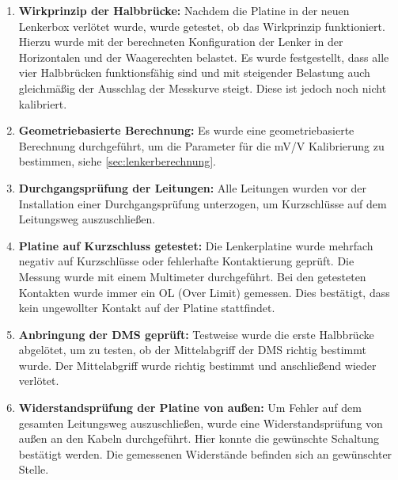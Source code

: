 \begin{enumerate}
    \item \textbf{Wirkprinzip der Halbbrücke:} Nachdem die Platine in der neuen Lenkerbox verlötet wurde, wurde getestet, ob das Wirkprinzip funktioniert. Hierzu wurde mit der berechneten Konfiguration der Lenker in der Horizontalen und der Waagerechten belastet. Es wurde festgestellt, dass alle vier Halbbrücken funktionsfähig sind und mit steigender Belastung auch gleichmäßig der Ausschlag der Messkurve steigt. Diese ist jedoch noch nicht kalibriert.
    
    \item \textbf{Geometriebasierte Berechnung:} Es wurde eine geometriebasierte Berechnung durchgeführt, um die Parameter für die mV/V Kalibrierung zu bestimmen, siehe \ref{sec:lenkerberechnung}.
    
    \item \textbf{Durchgangsprüfung der Leitungen:} Alle Leitungen wurden vor der Installation einer Durchgangsprüfung unterzogen, um Kurzschlüsse auf dem Leitungsweg auszuschließen.
    
    \item \textbf{Platine auf Kurzschluss getestet:} Die Lenkerplatine wurde mehrfach negativ auf Kurzschlüsse oder fehlerhafte Kontaktierung geprüft. Die Messung wurde mit einem Multimeter durchgeführt. Bei den getesteten Kontakten wurde immer ein OL (Over Limit) gemessen. Dies bestätigt, dass kein ungewollter Kontakt auf der Platine stattfindet.
    
    \item \textbf{Anbringung der DMS geprüft:} Testweise wurde die erste Halbbrücke abgelötet, um zu testen, ob der Mittelabgriff der DMS richtig bestimmt wurde. Der Mittelabgriff wurde richtig bestimmt und anschließend wieder verlötet.
    
    \item \textbf{Widerstandsprüfung der Platine von außen:} Um Fehler auf dem gesamten Leitungsweg auszuschließen, wurde eine Widerstandsprüfung von außen an den Kabeln durchgeführt. Hier konnte die gewünschte Schaltung bestätigt werden. Die gemessenen Widerstände befinden sich an gewünschter Stelle.
\end{enumerate}





